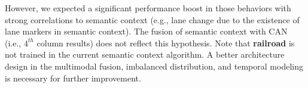 \documentclass[10pt,twocolumn,letterpaper]{article}
\begin{document}
However, we expected a significant performance boost in those behaviors with strong correlations to semantic context (e.g., lane change due to the existence of lane markers in semantic context). The fusion of semantic context with CAN (i.e., $4^{th}$ column results) does not reflect this hypothesis. Note that \textbf{railroad} is not trained in the current semantic context algorithm. A better architecture design in the multimodal fusion, imbalanced distribution, and temporal modeling is necessary for further improvement.





















\clearpage{\small


}
\end{document}
